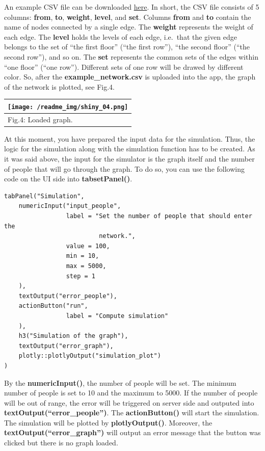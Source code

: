 \documentclass[
]{article}
\begin{document}
An example CSV file can be downloaded
\href{https://code.it4i.cz/ADAS-Private/shiny-bpg/-/blob/main/inst/app/example_network.csv}{here}.
In short, the CSV file consists of 5 columns: \textbf{from},
\textbf{to}, \textbf{weight}, \textbf{level}, and \textbf{set}. Columns
\textbf{from} and \textbf{to} contain the name of nodes connected by a
single edge. The \textbf{weight} represents the weight of each edge. The
\textbf{level} holds the levels of each edge, i.e.~that the given edge
belongs to the set of ``the first floor'' (``the first row''), ``the
second floor'' (``the second row''), and so on. The \textbf{set}
represents the common sets of the edges within ``one floor'' (``one
row''). Different sets of one row will be drawed by different color. So,
after the \textbf{example\_network.csv} is uploaded into the app, the
graph of the network is plotted, see Fig.4.

\begin{longtable}[]{@{}l@{}}
\toprule()
\texttt{[image: /readme\_img/shiny\_04.png]} \\
\midrule()
\endhead
Fig.4: Loaded graph. \\
\bottomrule()
\end{longtable}

At this moment, you have prepared the input data for the simulation.
Thus, the logic for the simulation along with the simulation function
has to be created. As it was said above, the input for the simulator is
the graph itself and the number of people that will go through the
graph. To do so, you can use the following code on the UI side into
\textbf{tabsetPanel()}.

\begin{verbatim}
tabPanel("Simulation",
    numericInput("input_people",
                 label = "Set the number of people that should enter the 
                          network.",
                 value = 100,
                 min = 10,
                 max = 5000,
                 step = 1
    ),
    textOutput("error_people"),
    actionButton("run",
                 label = "Compute simulation"
    ),
    h3("Simulation of the graph"),
    textOutput("error_graph"),
    plotly::plotlyOutput("simulation_plot")
)
\end{verbatim}

By the \textbf{numericInput()}, the number of people will be set. The
minimum number of people is set to 10 and the maximum to 5000. If the
number of people will be out of range, the error will be triggered on
server side and outputed into \textbf{textOutput(``error\_people'')}.
The \textbf{actionButton()} will start the simulation. The simulation
will be plotted by \textbf{plotlyOutput()}. Moreover, the
\textbf{textOutput(``error\_graph'')} will output an error message that
the button was clicked but there is no graph loaded.
\end{document}
